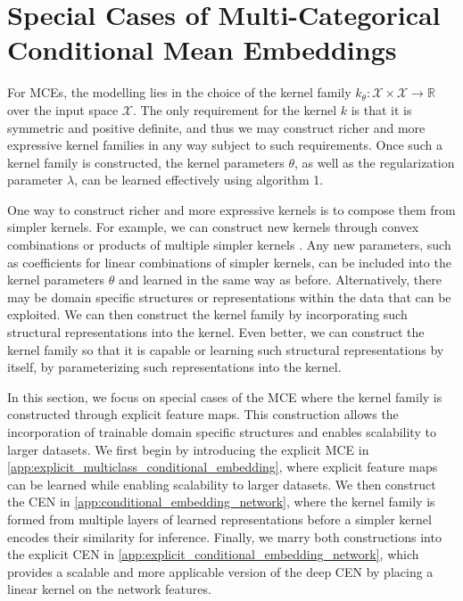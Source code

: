 \documentclass{llncs}
\numberwithin{equation}{section}
\numberwithin{table}{section}
\numberwithin{algorithm}{section}
\begin{document}
	\newpage
	\section{Special Cases of Multi-Categorical Conditional Mean Embeddings}
	\label{app:special_cases}
	
	For \glspl{MCE}, the modelling lies in the choice of the kernel family $k_{\theta} : \mathcal{X} \times \mathcal{X} \to \mathbb{R}$ over the input space $\mathcal{X}$. The only requirement for the kernel $k$ is that it is symmetric and positive definite, and thus we may construct richer and more expressive kernel families in any way subject to such requirements. Once such a kernel family is constructed, the kernel parameters $\theta$, as well as the regularization parameter $\lambda$, can be learned effectively using algorithm 1.
	
	One way to construct richer and more expressive kernels is to compose them from simpler kernels. For example, we can construct new kernels through convex combinations or products of multiple simpler kernels \citep{genton2001classes}. Any new parameters, such as coefficients for linear combinations of simpler kernels, can be included into the kernel parameters $\theta$ and learned in the same way as before. Alternatively, there may be domain specific structures or representations within the data that can be exploited. We can then construct the kernel family by incorporating such structural representations into the kernel. Even better, we can construct the kernel family so that it is capable or learning such structural representations by itself, by parameterizing such representations into the kernel.
	
	In this section, we focus on special cases of the \gls{MCE} where the kernel family is constructed through explicit feature maps. This construction allows the incorporation of trainable domain specific structures and enables scalability to larger datasets. We first begin by introducing the explicit \gls{MCE} in \cref{app:explicit_multiclass_conditional_embedding}, where explicit feature maps can be learned while enabling scalability to larger datasets. We then construct the \gls{CEN} in \cref{app:conditional_embedding_network}, where the kernel family is formed from multiple layers of learned representations before a simpler kernel encodes their similarity for inference. Finally, we marry both constructions into the explicit \gls{CEN} in \cref{app:explicit_conditional_embedding_network}, which provides a scalable and more applicable version of the deep \gls{CEN} by placing a linear kernel on the network features.
	
\end{document}
